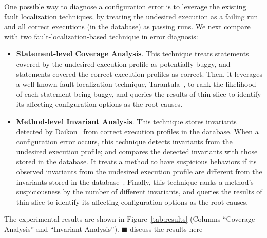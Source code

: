 

One possible way to diagnose a configuration error is to leverage
the existing fault localization techniques, by treating the undesired
execution as a failing run and all correct executions (in the database)
as passing runs. We next compare \ourtool with two fault-localization-based
technique in error diagnosis:

\begin{itemize}
\item \textbf{Statement-level Coverage Analysis}. This technique treats statements covered
by the undesired execution profile as potentially buggy, and statements
covered the correct execution profiles as correct.
Then, it leverages a well-known fault localization technique,
Tarantula~\cite{Jones:2002}, to rank the likelihood of each
statement being buggy, and queries the results of thin slice
to identify its affecting configuration options as the root causes.

\item \textbf{Method-level Invariant Analysis}. This technique stores invariants detected
by Daikon~\cite{Ernst:1999} from correct execution profiles in the database.
When a configuration error occurs, this technique detects invariants from the undesired execution profile;
and compares the detected invariants with those stored in the database.
It treats a method to have suspicious behaviors if its observed invariants
from the undesired execution profile are different from the invariants stored
in the database~\cite{McCamant:2003}. Finally, this technique ranks a method's suspiciousness by
the number of different invariants, and queries the results of thin slice
to identify its affecting configuration options as the root causes. 
\end{itemize}


The experimental results are shown in Figure~\ref{tab:results} (Columns
``Coverage Analysis'' and ``Invariant Analysis'').
$\blacksquare$ discuss the results here

